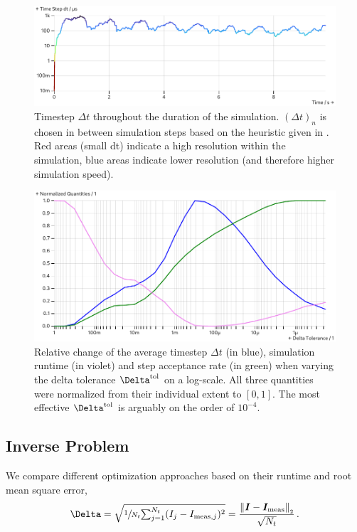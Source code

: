 \begin{figure}
  \includegraphics[width=\columnwidth]{../figures/results/dt-plot.pdf}
  \caption{Timestep $\Delta t$ throughout the duration of the simulation. $(\Delta t)_n$ is chosen in between simulation steps based on the heuristic given in . Red areas (small dt) indicate a high resolution within the simulation, blue areas indicate lower resolution (and therefore higher simulation speed).}
  \label{figure:dt-plot}
\end{figure}

\begin{figure}
  \includegraphics[width=\columnwidth]{../figures/results/delta-tolerance.pdf}
  \caption{Relative change of the average timestep $\Delta t$ (in blue), simulation runtime (in violet) and step acceptance rate (in green) when varying the delta tolerance $\Delta^{\rm tol}$ on a log-scale. All three quantities were normalized from their individual extent to $[0, 1]$. The most effective $\Delta^{\rm tol}$ is arguably on the order of $10^{-4}$.}
  \label{figure:delta-tolerance}
\end{figure}

\subsection{Inverse Problem}
We compare different optimization approaches based on their runtime and root mean square error,
$$\Delta = \sqrt{\sfrac{1}{N_t} {\textstyle \sum_{j=1}^{N_t}} (I_j - I_{{\rm meas}, j})^2} = \frac{\norm{\vec{I} - \vec{I}_{\rm meas}}}{\sqrt{N_t}}\,.$$

